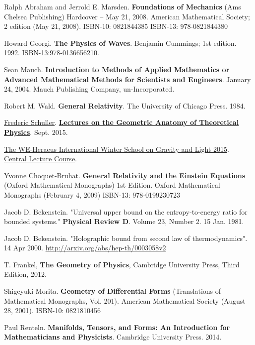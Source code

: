 \documentclass[10pt]{amsart}
\begin{document}
\begin{thebibliography}{9}
Ralph Abraham and Jerrold E. Marsden. 
\textbf{Foundations of Mechanics} (Ams Chelsea Publishing) Hardcover – May 21, 2008.  American Mathematical Society; 2 edition (May 21, 2008). ISBN-10: 0821844385
ISBN-13: 978-0821844380

Howard Georgi. \textbf{The Physics of Waves}. Benjamin Cummings; 1st edition. 1992. ISBN-13:978-0136656210.

Sean Mauch. \textbf{Introduction to Methods of Applied Mathematics or Advanced Mathematical Methods for Scientists and Engineers}. January 24, 2004. Mauch Publishing Company, un-Incorporated. 

Robert M. Wald. \textbf{General Relativity}. The University of Chicago Press. 1984.

\href{https://www.youtube.com/c/FredericSchuller}{Frederic Schuller}. \href{https://youtube.com/playlist?list=PLPH7f_7ZlzxTi6kS4vCmv4ZKm9u8g5yic}{\textbf{Lectures on the Geometric Anatomy of Theoretical Physics}}. Sept. 2015.

\href{https://www.youtube.com/@thewe-heraeusinternational2060/featured}{The WE-Heraeus International Winter School on Gravity and Light 2015}. \href{https://youtube.com/playlist?list=PLFeEvEPtX_0S6vxxiiNPrJbLu9aK1UVC_}{Central Lecture Course}.  

Yvonne Choquet-Bruhat.  \textbf{General Relativity and the Einstein Equations} (Oxford Mathematical Monographs) 1st Edition.  Oxford Mathematical Monographs (February 4, 2009) ISBN-13: 978-0199230723

Jacob D. Bekenstein. "Universal upper bound on the entropy-to-energy ratio for bounded systems." \textbf{Physical Review D}. Volume 23, Number 2. 15 Jan. 1981.

Jacob D. Bekenstein. "Holographic bound from second law of thermodynamics". 14 Apr 2000. \url{http://arxiv.org/abs/hep-th/0003058v2}


T. Frankel,
\textbf{The Geometry of Physics}, 
Cambridge University Press, 
Third Edition,
2012.

Shigeyuki Morita. \textbf{Geometry of Differential Forms} (Translations of Mathematical Monographs, Vol. 201). American Mathematical Society (August 28, 2001). ISBN-10: 0821810456

Paul Renteln. \textbf{Manifolds, Tensors, and Forms: An Introduction for Mathematicians and Physicists}. Cambridge University Press. 2014. 



\end{thebibliography}
\end{document}
